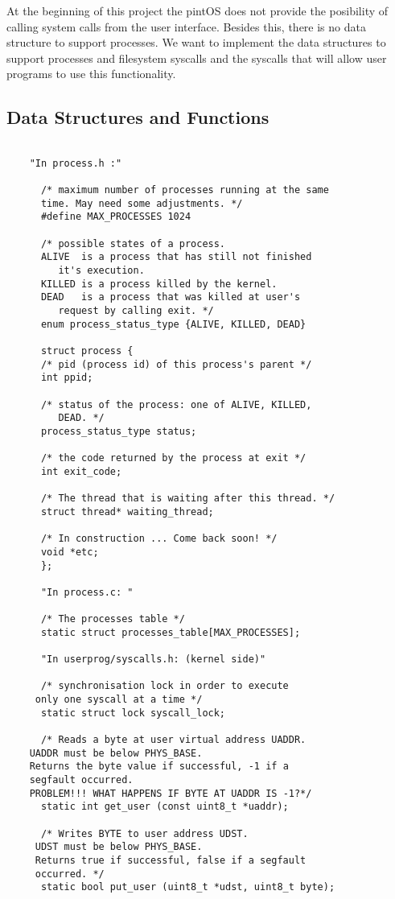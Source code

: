 	At the beginning of this project the pintOS does not provide the posibility of calling system calls from the user interface. Besides this, there is no data structure to support processes. We want to implement the data structures to support processes and filesystem syscalls and the syscalls that will allow user programs to use this functionality.

    \subsection{Data Structures and Functions}

    \begin{lstlisting}

    "In process.h :"
      
      /* maximum number of processes running at the same 
      time. May need some adjustments. */
      #define MAX_PROCESSES 1024

      /* possible states of a process. 
	  ALIVE  is a process that has still not finished 
		 it's execution. 
	  KILLED is a process killed by the kernel.
	  DEAD 	 is a process that was killed at user's 
		 request by calling exit. */
      enum process_status_type {ALIVE, KILLED, DEAD}

      struct process {
	  /* pid (process id) of this process's parent */
	  int ppid;				
	  
	  /* status of the process: one of ALIVE, KILLED, 
	     DEAD. */
	  process_status_type status;
      
	  /* the code returned by the process at exit */
	  int exit_code;

	  /* The thread that is waiting after this thread. */
	  struct thread* waiting_thread;

	  /* In construction ... Come back soon! */
	  void *etc;
      };

      "In process.c: "

      /* The processes table */
      static struct processes_table[MAX_PROCESSES];

      "In userprog/syscalls.h: (kernel side)"
      
      /* synchronisation lock in order to execute
	 only one syscall at a time */
      static struct lock syscall_lock;

      /* Reads a byte at user virtual address UADDR.
	UADDR must be below PHYS_BASE.
	Returns the byte value if successful, -1 if a 
	segfault occurred. 
	PROBLEM!!! WHAT HAPPENS IF BYTE AT UADDR IS -1?*/
      static int get_user (const uint8_t *uaddr);

      /* Writes BYTE to user address UDST.
	 UDST must be below PHYS_BASE.
	 Returns true if successful, false if a segfault 
	 occurred. */
      static bool put_user (uint8_t *udst, uint8_t byte);

    \end{lstlisting}


